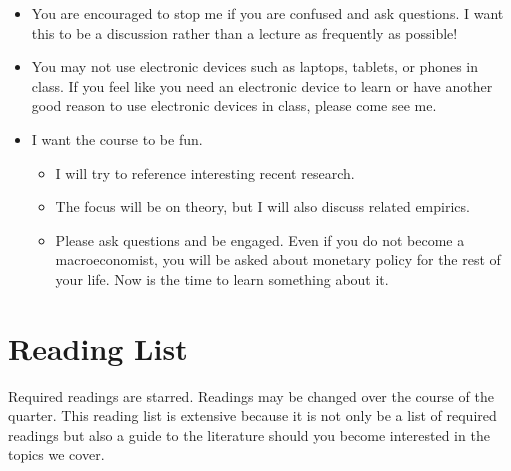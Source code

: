 \documentclass[12pt]{article}
\begin{document}
\begin{itemize}
	\item You are encouraged to stop me if you are confused and ask questions. I want this to be a discussion rather than a lecture as frequently as possible!
	\item You may not use electronic devices such as laptops, tablets, or phones in class. If you feel like you need an electronic device to learn or have another good reason to use electronic devices in class, please come see me.
	\item I want the course to be fun.
	\begin{itemize}
		\item I will try to reference interesting recent research.
		\item The focus will be on theory, but I will also discuss related empirics.
		\item Please ask questions and be engaged. Even if you do not become a macroeconomist, you will be asked about monetary policy for the rest of your life. Now is the time to learn something about it.
	\end{itemize}
\end{itemize}

\section*{Reading List}

Required readings are starred. Readings may be changed over the course of the quarter. This reading list is extensive because it is not only be a list of required readings but also
a guide to the literature should you become interested in the topics we cover.
\end{document}
